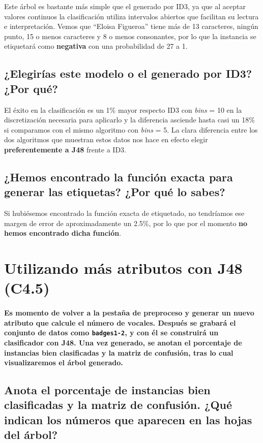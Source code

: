 \documentclass[12pt]{article}
\begin{document}
Este árbol es bastante más simple que el generado por ID3, ya que al aceptar valores continuos la clasificación utiliza intervalos abiertos que facilitan su lectura e interpretación. Vemos que ``Eloisa Figueroa'' tiene más de 13 caracteres, ningún punto, 15 o menos caracteres y 8 o menos consonantes, por lo que la instancia se etiquetará como \textbf{negativa} con una probabilidad de 27 a 1.

\subsection*{\small ¿Elegirías este modelo o el generado por ID3? ¿Por qué?}

El éxito en la clasificación es un 1\% mayor respecto ID3 con \emph{bins} = 10 en la discretización necesaria para aplicarlo y la diferencia asciende hasta casi un 18\% si comparamos con el mismo algoritmo con \emph{bins} = 5. La clara diferencia entre los dos algoritmos que muestran estos datos nos hace en efecto elegir \textbf{preferentemente a J48} frente a ID3.

\subsection*{\small ¿Hemos encontrado la función exacta para generar las etiquetas? ¿Por qué lo sabes?}

Si hubiésemos encontrado la función exacta de etiquetado, no tendríamos ese margen de error de aproximadamente un 2.5\%, por lo que por el momento \textbf{no hemos encontrado dicha función}.

\newpage

\section{Utilizando más atributos con J48 (C4.5)}

\paragraph{\small Es momento de volver a la pestaña de preproceso y generar un nuevo atributo que calcule el número de vocales. Después se grabará el conjunto de datos como \texttt{badges1-2}, y con él se construirá un clasificador con J48. Una vez generado, se anotan el porcentaje de instancias bien clasificadas y la matriz de confusión, tras lo cual visualizaremos el árbol generado.}

\subsection*{\small Anota el porcentaje de instancias bien clasificadas y la matriz de confusión. ¿Qué indican los números que aparecen en las hojas del árbol?}
\end{document}
